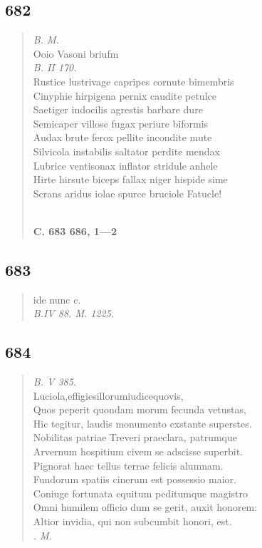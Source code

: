 \documentclass[11pt, a4paper]{report}
\begin{document}
            \subsection*{682}
      \begin{verse}
      \textit{B. M.} \\ Ooio Vasoni briufm \\ \textit{B. II 170.} \\ Rustice lustrivage capripes cornute bimembris \\ Cinyphie hirpigena pernix caudite petulce \\ Saetiger indocilis agrestis barbare dure \\ Semicaper villose fugax periure biformis \\ Audax brute ferox pellite incondite mute \\ Silvicola instabilis saltator perdite mendax \\ Lubrice ventisonax inflator stridule anhele \\ Hirte hirsute biceps fallax niger hispide sime \\ Scrans aridus iolae spurce bruciole Fatucle! \\ 
        ﻿\pagebreak 
    \begin{center} \textbf{C. 683 686, 1—2} \end{center} \marginpar{[159]} 
      \end{verse}
  
            \subsection*{683}
      \begin{verse}
      ide nunc c. \\ \textit{B.IV 88. M. 1225.} \\ 
      \end{verse}
  
            \subsection*{684}
      \begin{verse}
      \textit{B. V 385.} \\ Luciola,effigiesillorumiudicequovis, \\ Quos peperit quondam morum fecunda vetustas, \\ Hic tegitur, laudis monumento exstante superstes. \\ Nobilitas patriae Treveri praeclara, patrumque \\ Arvernum hospitium civem se adscisse superbit. \\ Pignorat haec tellus terrae felicis alumnam. \\ Fundorum spatiis cinerum est possessio maior. \\ Coniuge fortunata equitum peditumque magistro \\ Omni humilem officio dum se gerit, auxit honorem: \\ Altior invidia, qui non subcumbit honori, est. \\ \textit{. M.} \\ 
      \end{verse}
  
\end{document}
